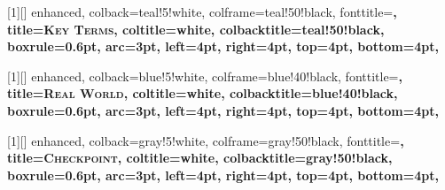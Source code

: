 \usepackage{fontspec}
\usepackage{microtype}
\newfontfamily{}
\usepackage[
    a4paper,
    inner=25mm,
    outer=25mm,
    top=25mm,
    bottom=30mm
]{geometry}
\usepackage{setspace}
\usepackage{amsmath,amssymb,amsthm}
\usepackage{booktabs}
\usepackage{array}
\usepackage{hieroglf}
\usepackage{graphicx}
\usepackage{xcolor}
\usepackage{tikz}
\usepackage{pgfplots}
\pgfplotsset{compat=1.18}
\usetikzlibrary{arrows.meta, positioning, shadows.blur, patterns, fillbetween, fit, backgrounds}
\usepackage{enumitem}
\newcommand{\circled}[1]{%
  \tikz[baseline=(char.base)]{
    \node[shape=circle, draw, inner sep=1.5pt, line width=0.6pt] (char) {\small #1};
  }%
}
\usepackage{listings}
\usepackage{caption}
\usepackage{subcaption}
\usepackage{marginnote}
\usepackage[hidelinks]{hyperref}
\usepackage{tcolorbox}

[1][]{%
  enhanced,
  colback=teal!5!white,
  colframe=teal!50!black,
  fonttitle=\bfseries\sffamily,
  title={\textsc{Key Terms}},
  coltitle=white,
  colbacktitle=teal!50!black,
  boxrule=0.6pt,
  arc=3pt,
  left=4pt, right=4pt, top=4pt, bottom=4pt,
}

[1][]{%
  enhanced,
  colback=blue!5!white,
  colframe=blue!40!black,
  fonttitle=\bfseries\sffamily,
  title={\textsc{Real World}},
  coltitle=white,
  colbacktitle=blue!40!black,
  boxrule=0.6pt,
  arc=3pt,
  left=4pt, right=4pt, top=4pt, bottom=4pt,
}

[1][]{%
  enhanced,
  colback=gray!5!white,
  colframe=gray!50!black,
  fonttitle=\bfseries\sffamily,
  title={\textsc{Checkpoint}},
  coltitle=white,
  colbacktitle=gray!50!black,
  boxrule=0.6pt,
  arc=3pt,
  left=4pt, right=4pt, top=4pt, bottom=4pt,
}

